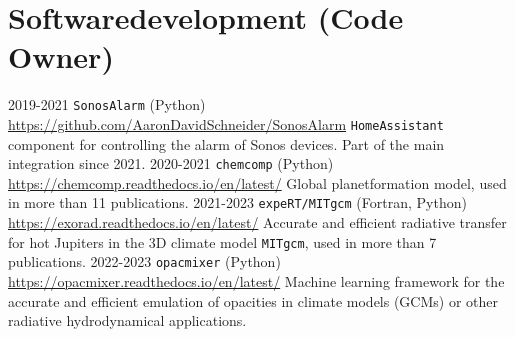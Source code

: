 \documentclass[]{friggeri-cv}
\begin{document}
\section{Softwaredevelopment (Code Owner)}
\begin{entrylist}
  \entry
    {2019-2021}
    {\texttt{SonosAlarm} (Python)}
    {\href{https://github.com/AaronDavidSchneider/SonosAlarm}{https://github.com/AaronDavidSchneider/SonosAlarm}}
    {\texttt{HomeAssistant} component for controlling the alarm of Sonos devices. Part of the main integration since 2021.}   
  \entry
    {2020-2021}
    {\texttt{chemcomp} (Python)}
    {\href{https://chemcomp.readthedocs.io/en/latest/}{https://chemcomp.readthedocs.io/en/latest/}}
    {Global planetformation model, used in more than 11 publications.}    
  \entry
    {2021-2023}
    {\texttt{expeRT/MITgcm} (Fortran, Python)}
    {\href{https://exorad.readthedocs.io/en/latest/}{https://exorad.readthedocs.io/en/latest/}}
    {Accurate and efficient radiative transfer for hot Jupiters in the 3D climate model \texttt{MITgcm}, used in more than 7 publications.}   
  \entry
    {2022-2023}
    {\texttt{opacmixer} (Python)}
    {\href{https://opacmixer.readthedocs.io/en/latest/}{https://opacmixer.readthedocs.io/en/latest/}}
    {Machine learning framework for the accurate and efficient emulation of opacities in climate models (GCMs) or other radiative hydrodynamical applications.}      
\end{entrylist}

\newpage
\end{document}
